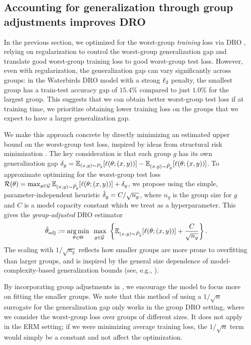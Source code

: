 \subsection{Accounting for generalization through group adjustments improves DRO}\label{sec:experiments_adjustments}
In the previous section, we optimized for the worst-group \emph{training} loss via DRO , relying on regularization to control the worst-group generalization gap and
translate good worst-group training loss to good worst-group test loss.
However, even with regularization, the generalization gap can vary significantly across groups: in the Waterbirds DRO model with a strong $\ell_2$ penalty, the smallest group has a train-test accuracy gap of $15.4\%$ compared to just $1.0\%$ for the largest group.
This suggests that we can obtain better worst-group test loss if at training time, we prioritize obtaining lower training loss on the groups that we expect to have a larger generalization gap.

We make this approach concrete by directly minimizing an estimated upper bound on the worst-group test loss,
inspired by ideas from structural risk minimization \citep{vapnik1992principles}.
The key consideration is that each group $g$ has its own generalization gap $\delta_{g} = \mathbb{E}_{(x,y) \sim P_g}[\ell(\theta; (x,y))] - \mathbb{E}_{(x,y) \sim {\hat{P}}_g}[\ell(\theta; (x,y))]$.
To approximate optimizing for the worst-group test loss
$\mathcal{R}(\theta) = \max_{g \in \mathcal{G}} \mathbb{E}_{(x,y) \sim {\hat{P}}_g}[\ell(\theta; (x,y))] + \delta_{g}$,
we propose using the simple, parameter-independent heuristic $\hat{\delta}_{g} = C/\sqrt{n_g}$,
where $n_g$ is the group size for $g$ and $C$ is a model capacity constant which we treat as a hyperparameter. This gives the \emph{group-adjusted} DRO estimator
\begin{align}\label{eqn:htadj}
    \htadj \eqdef \argmin_{\theta \in \Theta} \ \underset{g \in \sG}{\vphantom{\argmin}\max} \ \left\{ \E_{(x, y) \sim \hP_g}[\ell(\theta; (x, y))] + \frac{C}{\sqrt{n_g}}\right\}.
\end{align}
The scaling with $1 / \sqrt{n_g}$ reflects how smaller groups are more prone to overfitting
than larger groups, and is inspired by the general size dependence of model-complexity-based generalization bounds (see, e.g., \citet{cao2019learning}).

By incorporating group adjustments in ,
we encourage the model to focus more on fitting the smaller groups.
We note that this method of using a $1/\sqrt{n}$ surrogate for the generalization gap only works in the group DRO setting, where we consider the worst-group loss over groups of different sizes. It does not apply in the ERM setting; if we were minimizing average training loss, the $1/\sqrt{n}$ term would simply be a constant and not affect the optimization.


